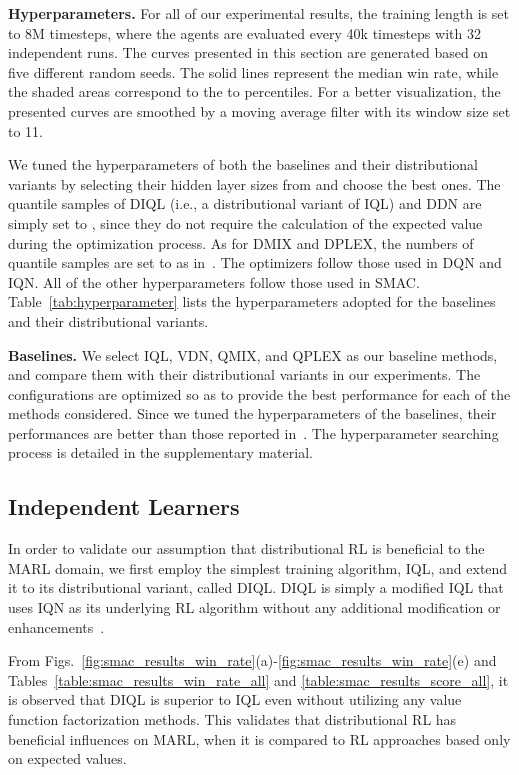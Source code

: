 \documentclass[twoside,11pt]{article}
\newcommand{\diql}{DIQL}
\newcommand{\ddn}{DDN}
\newcommand{\dmix}{DMIX}
\begin{document}
\textbf{Hyperparameters.}
For all of our experimental results, the training length is set to 8M timesteps, where the agents are evaluated every 40k timesteps with 32 independent runs. The curves presented in this section are generated based on five different random seeds. The solid lines represent the median win rate, while the shaded areas correspond to the  to  percentiles. For a better visualization, the presented curves are smoothed by a moving average filter with its window size set to 11. 

We tuned the hyperparameters of both the baselines and their distributional variants by selecting their hidden layer sizes from  and choose the best ones. The quantile samples of \diql{} (i.e., a distributional variant of IQL) and \ddn{} are simply set to , since they do not require the calculation of the expected value during the optimization process. As for \dmix{} and DPLEX, the numbers of quantile samples are set to  as in~\cite{Dabney2018IQN}. The optimizers follow those used in DQN and IQN. All of the other hyperparameters follow those used in SMAC. Table~\ref{tab:hyperparameter} lists the hyperparameters adopted for the baselines and their distributional variants.

\textbf{Baselines.}
We select IQL, VDN, QMIX, and QPLEX as our baseline methods, and compare them with their distributional variants in our experiments. The configurations are optimized so as to provide the best performance for each of the methods considered.
Since we tuned the hyperparameters of the baselines, their performances are better than those reported in~\citep{Samvelyan2019SMAC}. The hyperparameter searching process is detailed in the supplementary material.



\subsection{Independent Learners}
\label{subsec:experiment_results_independent_learners}

In order to validate our assumption that distributional RL is beneficial to the MARL domain, we first employ the simplest training algorithm, IQL, and extend it to its distributional variant, called \diql{}. \diql{} is simply a modified IQL that uses IQN as its underlying RL algorithm without any additional modification or enhancements~\citep{Matignon2007Hysteretic,Lyu2020LikelihoodQuantile}.

From Figs.~\ref{fig:smac_results_win_rate}(a)-\ref{fig:smac_results_win_rate}(e) and Tables~\ref{table:smac_results_win_rate_all} and \ref{table:smac_results_score_all}, it is observed that \diql{} is superior to IQL even without utilizing any value function factorization methods. This validates that distributional RL has beneficial influences on MARL, when it is compared to RL approaches based only on expected values.
\end{document}
